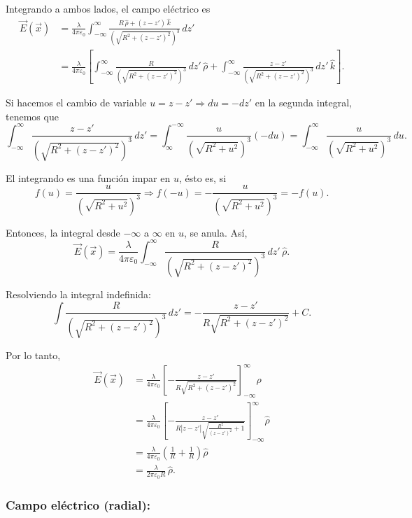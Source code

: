 \begin{ejemplo}
Integrando a ambos lados, el campo eléctrico es 
\begin{align*}
    \Vec{E}(\Vec{x}) &= \frac{\lambda}{4\pi \varepsilon_0} \int_{-\infty}^{\infty} \frac{R \,\hat{\rho} + (z-z')\, \hat{k}}{(\sqrt{R^2 + (z-z')^2})^3} \,dz' \\
    &= \frac{\lambda}{4\pi \varepsilon_0} \left[ \int_{-\infty}^{\infty} \frac{R}{(\sqrt{R^2 + (z-z')^2})^3} \,dz' \, \hat{\rho} + \int_{-\infty}^{\infty} \frac{z-z'}{(\sqrt{R^2 + (z-z')^2})^3} \,dz'\,\hat{k}\right].
\end{align*}

Si hacemos el cambio de variable $u = z - z' \Rightarrow du = - dz'$ en la segunda integral, tenemos que
$$\int_{-\infty}^{\infty} \frac{z-z'}{(\sqrt{R^2 + (z-z')^2})^3} \,dz' = \int_{\infty}^{-\infty} \frac{u}{(\sqrt{R^2 + u^2})^3} (- du) = \int_{-\infty}^{\infty} \frac{u}{(\sqrt{R^2 + u^2})^3} \,du.$$

El integrando es una función impar en $u$, ésto es, si
$$f(u) = \frac{u}{(\sqrt{R^2 + u^2})^3} \Rightarrow f(-u) = - \frac{u}{(\sqrt{R^2 + u^2})^3} = -f(u).$$

Entonces,  la integral desde $-\infty$ a $\infty$ en $u$, se anula. Así,
$$\Vec{E}(\Vec{x}) = \frac{\lambda}{4\pi \varepsilon_0}\int_{-\infty}^{\infty} \frac{R}{(\sqrt{R^2 + (z-z')^2})^3} \,dz' \, \hat{\rho} .$$

Resolviendo la integral indefinida:
$$\int \frac{R}{(\sqrt{R^2 + (z-z')^2})^3} \,dz' = - \frac{z-z'}{R\sqrt{R^2 + (z-z')^2}} + C .$$
 
Por lo tanto, 
\begin{align*}
    \vec{E}(\vec{x}) &= \frac{ \lambda}{4\pi \varepsilon_0} \left[ - \frac{z-z'}{R\sqrt{R^2 + (z-z')^2}} \right]_{-\infty}^{\infty} \hat{\rho} \\
&=  \frac{\lambda}{4\pi \varepsilon_0} \left[ - \frac{z-z'}{ R|z-z'|\sqrt{\frac{R^2}{(z-z')^2} + 1}} \right]_{-\infty}^{\infty} \hat{\rho} \\
&= \frac{\lambda}{4\pi \varepsilon_0} \left( \frac{1}{R} + \frac{1}{R} \right) \hat{\rho}  \\
&= \frac{\lambda}{2\pi \varepsilon_0 R} \,\hat{\rho}.
\end{align*}

\end{ejemplo}

\subsubsection{Campo eléctrico (radial):}

